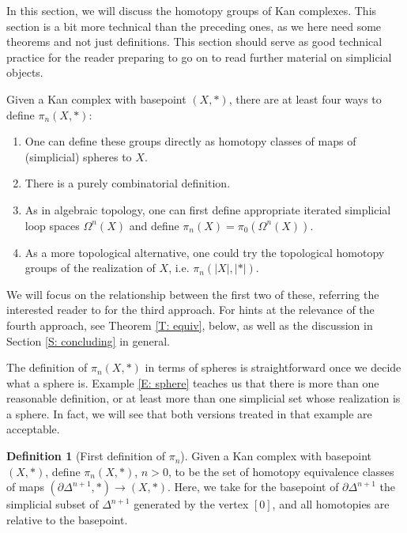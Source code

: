 \documentclass[12pt]{article}
\theoremstyle{plain}
\theoremstyle{definition}
\newtheorem{definition}[theorem]{Definition}
\newcommand{\bd}{\partial}
\begin{document}
In this section, we will discuss the homotopy groups of Kan complexes. This section is a bit more technical than the preceding ones, as we here need some theorems and not just definitions. This section should serve as good technical practice for the reader preparing to go on to read  further material on simplicial objects. 

Given a  Kan complex  with basepoint $(X,*)$, there are at least four ways to define $\pi_n(X,*)$:

\begin{enumerate} 

\item One can define these groups directly as homotopy classes of maps of (simplicial) spheres to $X$.

\item There is a purely combinatorial definition.


\item As in algebraic topology, one can first define appropriate iterated simplicial loop spaces $\Omega^n(X)$ and define $\pi_n(X)=\pi_0(\Omega^n(X))$. 

\item As a more topological alternative, one could try the topological homotopy groups of the realization of $X$, i.e. $\pi_n(|X|,|*|)$.
\end{enumerate}

We will focus on the relationship between the first two of these, referring the interested reader to \cite{MOORE} for the third approach. For hints at the relevance of the fourth approach, see Theorem \ref{T: equiv}, below, as well as the discussion in Section \ref{S: concluding} in general. 


The definition of $\pi_n(X,*)$ in terms of spheres is straightforward once we decide what a sphere is. Example \ref{E: sphere} teaches us that there is more than one reasonable definition, or at least more than one simplicial set whose realization is a sphere. In fact, we will see that both versions treated in that example are acceptable. 

\begin{definition}[First definition of $\pi_n$]\label{D: pin1}
Given a Kan complex  with basepoint $(X,*)$, define $\pi_n(X,*)$, $n>0$, to be the set of homotopy equivalence classes of maps $(\bd \Delta^{n+1},*)\to (X,*)$. Here, we take for the basepoint of $\bd \Delta^{n+1}$ the simplicial subset of $\Delta^{n+1}$ generated by the vertex $[0]$, and all homotopies are relative to the basepoint.
\end{definition}
\end{document}
